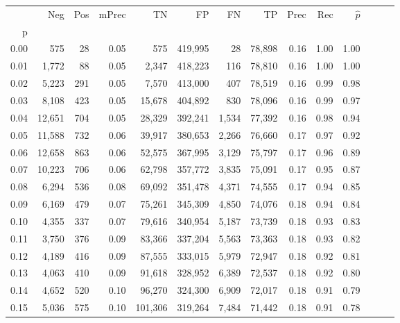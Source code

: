 \begin{tabular}{rrrrrrrrrrrrrr}
\toprule
{} &     Neg &    Pos & mPrec &       TN &       FP &      FN &      TP &  Prec &   Rec & $\hat{p}$ \\
p    &         &        &       &          &          &         &         &       &       &           \\
\midrule
0.00 &     575 &     28 &  0.05 &      575 &  419,995 &      28 &  78,898 &  0.16 &  1.00 &      1.00 \\
0.01 &   1,772 &     88 &  0.05 &    2,347 &  418,223 &     116 &  78,810 &  0.16 &  1.00 &      1.00 \\
0.02 &   5,223 &    291 &  0.05 &    7,570 &  413,000 &     407 &  78,519 &  0.16 &  0.99 &      0.98 \\
0.03 &   8,108 &    423 &  0.05 &   15,678 &  404,892 &     830 &  78,096 &  0.16 &  0.99 &      0.97 \\
0.04 &  12,651 &    704 &  0.05 &   28,329 &  392,241 &   1,534 &  77,392 &  0.16 &  0.98 &      0.94 \\
0.05 &  11,588 &    732 &  0.06 &   39,917 &  380,653 &   2,266 &  76,660 &  0.17 &  0.97 &      0.92 \\
0.06 &  12,658 &    863 &  0.06 &   52,575 &  367,995 &   3,129 &  75,797 &  0.17 &  0.96 &      0.89 \\
0.07 &  10,223 &    706 &  0.06 &   62,798 &  357,772 &   3,835 &  75,091 &  0.17 &  0.95 &      0.87 \\
0.08 &   6,294 &    536 &  0.08 &   69,092 &  351,478 &   4,371 &  74,555 &  0.17 &  0.94 &      0.85 \\
0.09 &   6,169 &    479 &  0.07 &   75,261 &  345,309 &   4,850 &  74,076 &  0.18 &  0.94 &      0.84 \\
0.10 &   4,355 &    337 &  0.07 &   79,616 &  340,954 &   5,187 &  73,739 &  0.18 &  0.93 &      0.83 \\
0.11 &   3,750 &    376 &  0.09 &   83,366 &  337,204 &   5,563 &  73,363 &  0.18 &  0.93 &      0.82 \\
0.12 &   4,189 &    416 &  0.09 &   87,555 &  333,015 &   5,979 &  72,947 &  0.18 &  0.92 &      0.81 \\
0.13 &   4,063 &    410 &  0.09 &   91,618 &  328,952 &   6,389 &  72,537 &  0.18 &  0.92 &      0.80 \\
0.14 &   4,652 &    520 &  0.10 &   96,270 &  324,300 &   6,909 &  72,017 &  0.18 &  0.91 &      0.79 \\
0.15 &   5,036 &    575 &  0.10 &  101,306 &  319,264 &   7,484 &  71,442 &  0.18 &  0.91 &      0.78 \\

\end{tabular}
